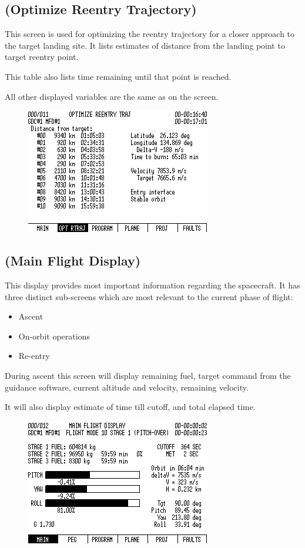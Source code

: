 \subsection{ (Optimize Reentry Trajectory)}

This screen is used for optimizing the reentry trajectory for a closer approach to the target landing site. It lists estimates of distance from the landing point to target reentry point.

This table also lists time remaining until that point is reached.

All other displayed variables are the same as on the  screen.

\begin{figure}[htb]
\centering
\includegraphics[bb=0 0 9cm 7cm,scale=0.50]{../graphics/rv550_screen8.png}
\end{figure}

\subsection{ (Main Flight Display)}
This display provides most important information regarding the spacecraft. It has three distinct sub-screens which are most relevant to the current phase of flight:
\begin{itemize}
	\item Ascent 
	\item On-orbit operations
	\item Re-entry
\end{itemize}

During ascent this screen will display remaining fuel, target command from the guidance software, current altitude and velocity, remaining velocity.

It will also display estimate of time till cutoff, and total elapsed time.

\begin{figure}[htb]
\centering
\includegraphics[bb=0 0 9cm 7cm,scale=0.50]{../graphics/rv550_screen1.png}
\end{figure}

